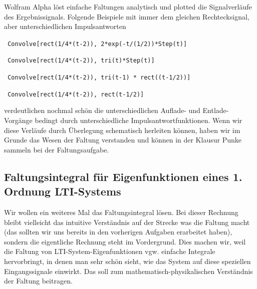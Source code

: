 \newpage
Wolfram Alpha löst einfache Faltungen analytisch und plotted die Signalverläufe
des Ergebnissignals. Folgende Beispiele mit immer
dem gleichen Rechtecksignal, aber unterschiedlichen Impulsantworten

\verb| Convolve[rect(1/4*(t-2)), 2*exp(-t/(1/2))*Step(t)]|

\verb| Convolve[rect(1/4*(t-2)), tri(t)*Step(t)]|

\verb| Convolve[rect(1/4*(t-2)), tri(t-1) * rect((t-1/2))]|

\verb| Convolve[rect(1/4*(t-2)), rect(t-1/2)]|

verdeutlichen nochmal schön die unterschiedlichen Auflade- und Entlade-Vorgänge
bedingt durch unterschiedliche Impulsantwortfunktionen. Wenn wir diese Verläufe
durch Überlegung schematisch herleiten können, haben wir im Grunde das Wesen der
Faltung verstanden und können in der Klausur Punke sammeln bei der Faltungsaufgabe.

\cleardoublepage
\subsection{Faltungsintegral für Eigenfunktionen eines 1. Ordnung LTI-Systems}
\label{sec:3355CAE61A}
\begin{Ziel}
Wir wollen ein weiteres Mal das Faltungsintegral lösen.
Bei dieser Rechnung bleibt vielleicht das intuitive Verständnis auf der Strecke
was die Faltung macht
(das sollten wir uns bereits in den vorherigen Aufgaben
erarbeitet haben), sondern die eigentliche Rechnung steht im Vordergrund.
Dies machen wir, weil die Faltung von LTI-System-Eigenfunktionen vgw. einfache
Integrale hervorbringt, in denen man sehr schön sieht, wie das System auf diese speziellen
Eingangssignale einwirkt.
Das soll zum mathematisch-physikalischen Verständnis der Faltung beitragen.
\end{Ziel}

